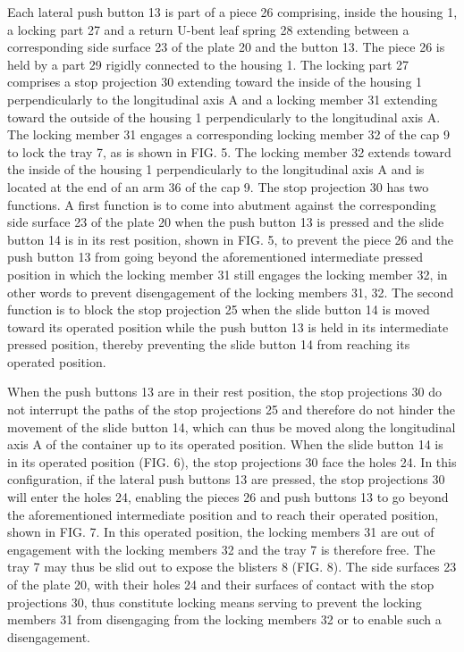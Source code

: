 \documentclass[11pt,a4paper]{article}
\begin{document}
Each lateral push button 13 is part of a piece 26 comprising, inside the housing 1, a locking part 27 and a return U-bent leaf spring 28 extending between a corresponding side surface 23 of the plate 20 and the button 13. The piece 26 is held by a part 29 rigidly connected to the housing 1. The locking part 27 comprises a stop projection 30 extending toward the inside of the housing 1 perpendicularly to the longitudinal axis A and a locking member 31 extending toward the outside of the housing 1 perpendicularly to the longitudinal axis A. The locking member 31 engages a corresponding locking member 32 of the cap 9 to lock the tray 7, as is shown in FIG. 5. The locking member 32 extends toward the inside of the housing 1 perpendicularly to the longitudinal axis A and is located at the end of an arm 36 of the cap 9. The stop projection 30 has two functions. A first function is to come into abutment against the corresponding side surface 23 of the plate 20 when the push button 13 is pressed and the slide button 14 is in its rest position, shown in FIG. 5, to prevent the piece 26 and the push button 13 from going beyond the aforementioned intermediate pressed position in which the locking member 31 still engages the locking member 32, in other words to prevent disengagement of the locking members 31, 32. The second function is to block the stop projection 25 when the slide button 14 is moved toward its operated position while the push button 13 is held in its intermediate pressed position, thereby preventing the slide button 14 from reaching its operated position.

When the push buttons 13 are in their rest position, the stop projections 30 do not interrupt the paths of the stop projections 25 and therefore do not hinder the movement of the slide button 14, which can thus be moved along the longitudinal axis A of the container up to its operated position. When the slide button 14 is in its operated position (FIG. 6), the stop projections 30 face the holes 24. In this configuration, if the lateral push buttons 13 are pressed, the stop projections 30 will enter the holes 24, enabling the pieces 26 and push buttons 13 to go beyond the aforementioned intermediate position and to reach their operated position, shown in FIG. 7. In this operated position, the locking members 31 are out of engagement with the locking members 32 and the tray 7 is therefore free. The tray 7 may thus be slid out to expose the blisters 8 (FIG. 8). The side surfaces 23 of the plate 20, with their holes 24 and their surfaces of contact with the stop projections 30, thus constitute locking means serving to prevent the locking members 31 from disengaging from the locking members 32 or to enable such a disengagement.
\end{document}
